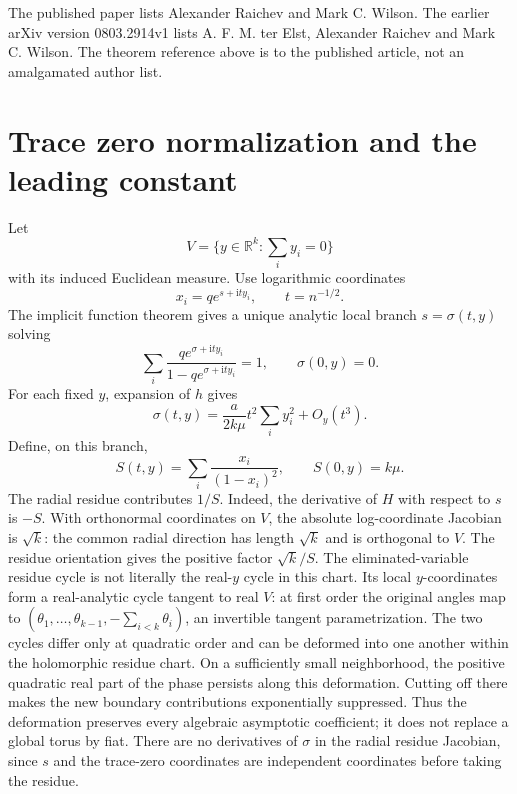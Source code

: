 \documentclass[11pt]{article}
\theoremstyle{remark}\newtheorem{remark}[theorem]{Remark}
\newcommand{\R}{\mathbb R}
\newcommand{\ii}{\mathrm i}
\begin{document}
The published paper \cite{rw} lists Alexander Raichev and Mark C. Wilson. The earlier arXiv version 0803.2914v1 lists A. F. M. ter Elst, Alexander Raichev and Mark C. Wilson. The theorem reference above is to the published article, not an amalgamated author list.

\section{Trace zero normalization and the leading constant}\label{orp:sec:constant}
Let
\[
 V=\{y\in\R^k:\textstyle\sum_i y_i=0\}
\]
with its induced Euclidean measure. Use logarithmic coordinates
\begin{equation}\label{orp:eq:radial}
 x_i=qe^{s+\ii t y_i},\qquad t=n^{-1/2}.
\end{equation}
The implicit function theorem gives a unique analytic local branch $s=\sigma(t,y)$ solving
\begin{equation}\label{orp:eq:sigma}
 \sum_i\frac{qe^{\sigma+\ii t y_i}}{1-qe^{\sigma+\ii t y_i}}=1,
 \qquad \sigma(0,y)=0.
\end{equation}
For each fixed $y$, expansion of $h$ gives
\begin{equation}\label{orp:eq:sigma2}
 \sigma(t,y)=\frac{a}{2k\mu}t^2\sum_i y_i^2+O_y(t^3).
\end{equation}
Define, on this branch,
\[
 S(t,y)=\sum_i\frac{x_i}{(1-x_i)^2},\qquad S(0,y)=k\mu.
\]
The radial residue contributes $1/S$. Indeed, the derivative of $H$ with respect to $s$ is $-S$. With orthonormal coordinates on $V$, the absolute log-coordinate Jacobian is $\sqrt{k}$: the common radial direction has length $\sqrt{k}$ and is orthogonal to $V$. The residue orientation gives the positive factor $\sqrt{k}/S$. The eliminated-variable residue cycle is not literally the real-$y$ cycle in this chart. Its local $y$-coordinates form a real-analytic cycle tangent to real $V$: at first order the original angles map to $(\theta_1,\ldots,\theta_{k-1},-\sum_{i<k}\theta_i)$, an invertible tangent parametrization. The two cycles differ only at quadratic order and can be deformed into one another within the holomorphic residue chart. On a sufficiently small neighborhood, the positive quadratic real part of the phase persists along this deformation. Cutting off there makes the new boundary contributions exponentially suppressed. Thus the deformation preserves every algebraic asymptotic coefficient; it does not replace a global torus by fiat. There are no derivatives of $\sigma$ in the radial residue Jacobian, since $s$ and the trace-zero coordinates are independent coordinates before taking the residue.
\end{document}
